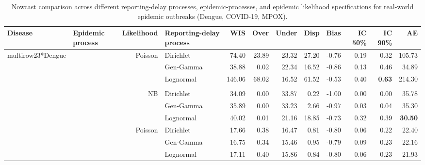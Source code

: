 \documentclass[12pt]{article}
\begin{document}
\begin{table}[!htb]
\centering
\caption{Nowcast comparison across different reporting-delay processes, epidemic-processes, and epidemic likelihood specifications for real-world epidemic outbreaks (Dengue, COVID-19, MPOX).}
\tiny
\setlength{\tabcolsep}{3pt}
\begin{tabular}{>{\raggedleft\arraybackslash}p{0.40in} | >{\raggedleft\arraybackslash}p{0.45in} | r | >{\raggedleft\arraybackslash}p{0.85in} | r r r r r r r r}
\toprule
\bf Disease & \bf Epidemic process & \bf Likelihood & \bf Reporting-delay process & \bf WIS & \bf Over & \bf Under & \bf Disp & \bf Bias & \bf IC 50\% & \bf IC 90\% & \bf AE \\
\midrule
 
multirow{23}{*}{Dengue}
 
& \multirow{7}{*}{AR(1)}
 
& \multirow{3}{*}{Poisson}
& \cellcolor{delayC!25}Dirichlet      & 74.40  & 23.89 & 23.32 & 27.20 & -0.76 & 0.19 & 0.32 & 105.73 \\
& & & \cellcolor{delayB!25}Gen-Gamma   & 38.88  & 0.02  & 22.34 & 16.52 & -0.86 & 0.13 & 0.46 & 34.89 \\
& & & \cellcolor{delayA!25}Lognormal   & 146.06 & 68.02 & 16.52 & 61.52 & -0.53 & 0.40 & \bf 0.63 & 214.30 \\
 
\\
 
& & \multirow{3}{*}{NB}
& \cellcolor{delayC!25}Dirichlet      & 34.09  & 0.00  & 33.87 & 0.22  & -1.00 & 0.00 & 0.00 & 35.78 \\
& & & \cellcolor{delayB!25}Gen-Gamma   & 35.89  & 0.00  & 33.23 & 2.66  & -0.97 & 0.03 & 0.04 & 35.30 \\
& & & \cellcolor{delayA!25}Lognormal   & 40.02  & 0.01  & 21.16 & 18.85 & -0.73 & 0.32 & 0.39 & \bf 30.50 \\
 
\midrule
 
& \multirow{7}{*}{HSGP}
 
& \multirow{3}{*}{Poisson}
& \cellcolor{delayC!25}Dirichlet      & 17.66  & 0.38  & 16.47 & 0.81  & -0.80 & 0.06 & 0.22 & 22.40 \\
& & & \cellcolor{delayB!25}Gen-Gamma   & 16.75  & 0.34  & 15.46 & 0.95  & -0.79 & 0.09 & 0.23 & 22.16 \\
& & & \cellcolor{delayA!25}Lognormal   & 17.11  & 0.40  & 15.86 & 0.84  & -0.80 & 0.06 & 0.23 & 21.93 \\
 

\end{tabular}
\end{table}
\end{document}
